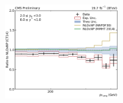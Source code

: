 \begin{figure}[htbp]
    \includegraphics[width=0.45\textwidth]{figures/measurement/ratio_to_Ct14nlo+np_totcomp_yb2ys0.pdf}
    \caption[]{}
    \label{fig:ratio_ct10_nlo}
\end{figure}


\label{sec:nlo_comparisons}
